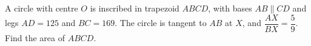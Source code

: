 A circle with centre $O$ is inscribed in trapezoid $ABCD$, with bases $AB\parallel CD$ and legs $AD=125$ and $BC=169$. The circle is tangent to $AB$ at $X$, and $\dfrac{AX}{BX}=\dfrac59$. Find the area of $ABCD$.
